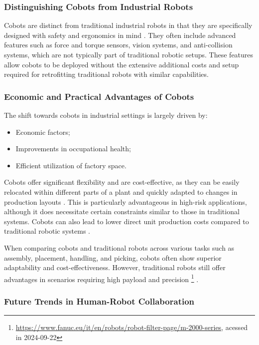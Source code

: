 \subsubsection{Distinguishing Cobots from Industrial Robots}

Cobots are distinct from traditional industrial robots in that they are specifically designed with safety and ergonomics in mind \cite{cobots-design}. 
They often include advanced features such as force and torque sensors, vision systems, and anti-collision systems, which are not typically part of traditional 
robotic setups. These features allow cobots to be deployed without the extensive additional costs and setup required for retrofitting traditional 
robots with similar capabilities.

\subsubsection{Economic and Practical Advantages of Cobots}

The shift towards cobots in industrial settings is largely driven by:
\begin{itemize}
    \item Economic factors;
    \item Improvements in occupational health;
    \item Efficient utilization of factory space.
\end{itemize}

Cobots offer significant flexibility and are cost-effective, as they can be easily relocated within different parts of a plant and quickly 
adapted to changes in production layouts \cite{cobots-implementation}. This is particularly advantageous in high-risk applications, although 
it does necessitate certain constraints similar to those in traditional systems.
Cobots can also lead to lower direct unit production costs compared to traditional robotic systems \cite{cobot-2019collaborative}.

When comparing cobots and traditional robots across various tasks such as assembly, placement, handling, and picking, cobots often show superior 
adaptability and cost-effectiveness. However, traditional robots still offer advantages in scenarios requiring high payload and precision 
\footnote{\url{https://www.fanuc.eu/it/en/robots/robot-filter-page/m-2000-series}, acessed in 2024-09-22} \cite{robotics8040100}. 



\subsubsection{Future Trends in Human-Robot Collaboration}

